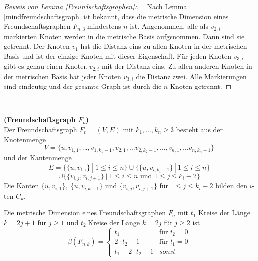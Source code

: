 \newpage
\begin{proof}[Beweis von Lemma \ref{Freundschaftsgraphen}:] \vspace{+1mm} ~ \linebreak
Nach Lemma \ref{mindfreundschaftsgraph} ist bekannt, dass die metrische Dimension eines Freundschaftsgraphen $F_{n,3}$ mindestens $n$ ist. Angenommen, alle als $v_{2,i}$ markierten Knoten werden in die metrische Basis aufgenommen. Dann sind sie getrennt. Der Knoten $v_1$ hat die Distanz eins zu allen Knoten in der metrischen Basis und ist der einzige Knoten mit dieser Eigenschaft. Für jeden Knoten $v_{3,i}$ gibt es genau einen Knoten $v_{2,i}$ mit der Distanz eins. Zu allen anderen Knoten in der metrischen Basis hat jeder Knoten $v_{3,i}$ die Distanz zwei. Alle Markierungen sind eindeutig und der gesamte Graph ist durch die $n$ Knoten getrennt.
\end{proof}
\vspace{-14mm}
~ \linebreak
\begin{defi}{\textbf{(Freundschaftsgraph $F_n$)}}\\
Der Freundschaftsgraph $F_{n}=(V,E)$ mit $k_1,\ldots, k_n \geq 3 $ besteht aus der Knotenmenge $$V = \{u,v_{1,1}, \ldots, v_{1,k_1-1},v_{2,1},\ldots v_{2,k_2-1},\ldots,v_{n,1},\ldots v_{n,k_n-1}\}$$ und der Kantenmenge $$E = \{ \{u,v_{1,i}\}~|~ 1 \leq i \leq n \} \cup \{ \{u,v_{i,k_i-1}\}~|~ 1 \leq i \leq n \}$$$$\cup \{ \{ v_{i,j}, v_{i,j+1} \} ~|~ 1 \leq i \leq n \text{ und }1 \leq j \leq k_i-2\}$$
Die Kanten $\{u,v_{i,1}\},\;\{u,v_{i,k-1}\}$ und $\{v_{i,j},v_{i,j+1}\}$ für $1 \leq j \leq k_i-2$ bilden den $i$-ten $C_k$.
\end{defi}

\vspace{-1mm}
\begin{lem} \cite{amal}
\label{verallgFreundschaftsgraphen}
Die metrische Dimension eines Freundschaftsgraphen $F_{n}$ mit $t_1$ Kreise der Länge $k=2j+1$ für $j \geq 1$ und $t_2$ Kreise der Länge $k=2j$ für $j \geq 2$ ist 
\begin{equation}
   \beta(F_{n,k})=
   \begin{cases}
     t_1 & \text{f\"ur } t_2=0 \\
     2\cdot t_2-1 & \text{f\"ur } t_1=0 \\
     t_1+ 2\cdot t_2-1 & sonst
   \end{cases}
\end{equation}
\end{lem}
\label{amal}

